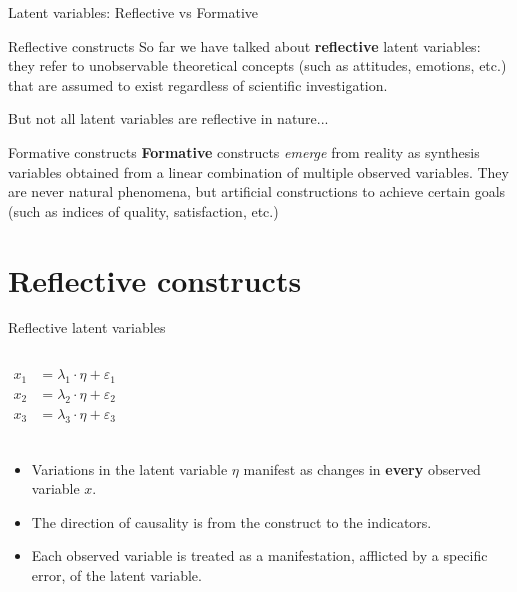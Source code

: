 \documentclass{beamer}
\begin{document}
\begin{frame}{Latent variables: Reflective vs Formative}
    \begin{block}{Reflective constructs}
        So far we have talked about \textbf{reflective} latent variables: they refer to unobservable theoretical concepts (such as attitudes, emotions, etc.) that are assumed to exist regardless of scientific investigation.
    \end{block}
    But not all latent variables are reflective in nature... \\
    \pause
    \begin{block}{Formative constructs}
        \textbf{Formative} constructs \textit{emerge} from reality as synthesis variables obtained from a linear combination of multiple observed variables. They are never natural phenomena, but artificial constructions to achieve certain goals (such as indices of quality, satisfaction, etc.)
    \end{block} 
\end{frame}

\section{Reflective constructs}
\begin{frame}{Reflective latent variables}
    \begin{columns}
    \[
    \begin{aligned}
    x_1 &= \lambda_1 \cdot \eta + \varepsilon_1 \\
    x_2 &= \lambda_2 \cdot \eta + \varepsilon_2 \\
    x_3 &= \lambda_3 \cdot \eta + \varepsilon_3 \\
    \end{aligned}
    \]
    \end{columns}
    \vspace{1em}
    \pause
    \begin{itemize}
        \item Variations in the latent variable $\eta$ manifest as changes in \textbf{every} observed variable $x$.
        \item The direction of causality is from the construct to the indicators.
        \item Each observed variable is treated as a manifestation, afflicted by a specific error, of the latent variable.
    \end{itemize}
\end{frame}
\end{document}
